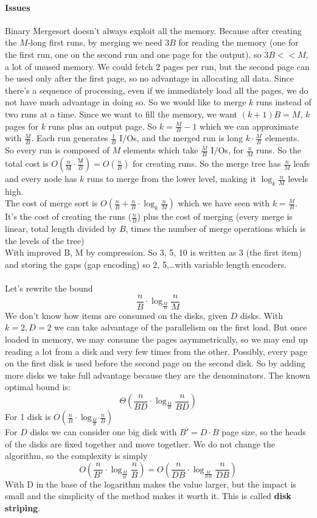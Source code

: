 \documentclass[10pt]{report}
\begin{document}
\paragraph{Issues} Binary Mergesort doesn't always exploit all the memory. Because after creating the $M$-long first runs, by merging we need $3B$ for reading the memory (one for the first run, one on the second run and one page for the output), so $3B << M$, a lot of unused memory. We could fetch 2 pages per run, but the second page can be used only after the first page, so no advantage in allocating all data. Since there's a sequence of processing, even if we immediately load all the pages, we do not have much advantage in doing so. So we would like to merge $k$ runs instead of two runs at a time. Since we want to fill the memory, we want $(k+1)B = M$, $k$ pages for $k$ runs plus an output page. So $k = \frac{M}{B} - 1$ which we can approximate with $\frac{M}{B}$. Each run generates $\frac{1}{B}$ I/Os, and the merged run is long $k\cdot\frac{M}{B}$ elements.\\
So every run is composed of $M$ elements which take $\frac{M}{B}$ I/Os, for $\frac{n}{M}$ runs. So the total cost is $O(\frac{n}{\not M} \cdot \frac{\not M}{B}) = O(\frac{n}{B})$ for creating runs. So the merge tree has $\frac{n}{M}$ leafs and every node has $k$ runs to merge from the lower level, making it $\log_k \frac{n}{M}$ levels high.\\
The cost of merge sort is $O(\frac{n}{B} + \frac{n}{B}\cdot\log_k \frac{n}{M})$ which we have seen with $k = \frac{M}{B}$. It's the cost of creating the runs ($\frac{n}{B}$) plus the cost of merging (every merge is linear, total length divided by $B$, times the number of merge operations which is the levels of the tree)\\
With improved B, M by compression. So 3, 5, 10 is written as 3 (the first item) and storing the gaps (gap encoding) so 2, 5,\ldots with variable length encoders.\\\\
Let's rewrite the bound
$$\frac{n}{B}\cdot\log_{\frac{M}{B}}\frac{n}{M}$$
We don't know how items are consumed on the disks, given $D$ disks. With $k = 2, D = 2$ we can take advantage of the parallelism on the first load. But once loaded in memory, we may consume the pages asymmetrically, so we may end up reading a lot from a disk and very few times from the other. Possibly, every page on the first disk is used before the second page on the second disk. So by adding more disks we take full advantage because they are the denominators. The known optimal bound is:
$$\Theta\left(\frac{n}{BD}\cdot\log_{\frac{M}{B}}\frac{n}{BD}\right)$$
For 1 disk is $O(\frac{n}{B}\cdot\log_{\frac{M}{B}}\frac{n}{B})$\\
For $D$ disks we can consider one big disk with $B' = D\cdot B$ page size, so the heads of the disks are fixed together and move together. We do not change the algorithm, so the complexity is simply $$O\left(\frac{n}{B'}\cdot\log_{\frac{M}{B'}}\frac{n}{B}\right) = O\left(\frac{n}{DB}\cdot\log_{\frac{M}{DB}}\frac{n}{DB}\right)$$ With D in the base of the logarithm makes the value larger, but the impact is small and the simplicity of the method makes it worth it. This is called \textbf{disk striping}.
\end{document}
